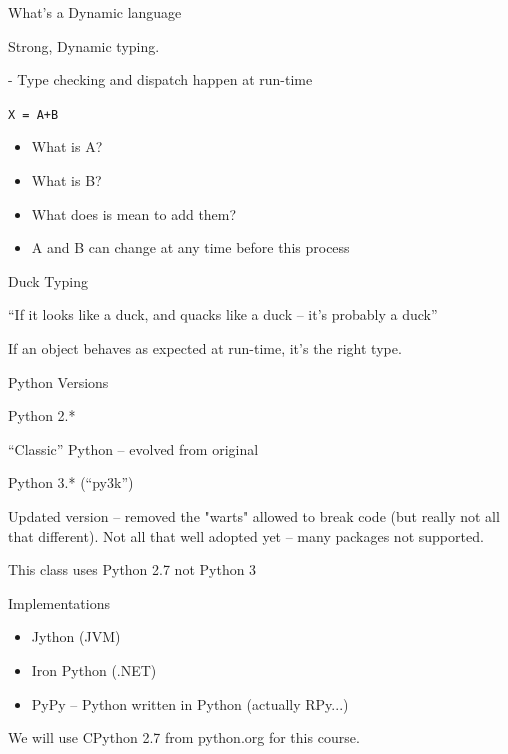 \documentclass{beamer}
\begin{document}
\begin{frame}[fragile]{What's a Dynamic language}

{Strong, Dynamic typing.}

 - Type checking and dispatch happen at run-time

\vspace{0.25in}
{\Large \verb!X = A+B!}
\vspace{0.1in}
\begin{itemize}
\pause
  \item What is A?
  \item What is B?
  \item What does is mean to add them?
\vspace{0.2in}
\pause
  \item A and B can change at any time before this process
\end{itemize}

\end{frame} 


\begin{frame}{Duck Typing}

\vspace{0.25in}
{\center \Large ``If it looks like a duck, and quacks like a duck -- it's probably a duck''}

\pause
\vspace{0.5in}
{\center \Large If an object behaves as expected at run-time, it's the right type.}

\end{frame}



\begin{frame}{Python Versions}

{\Large Python 2.*}

``Classic'' Python -- evolved from original

\vspace{0.25in}
{\Large Python 3.* (``py3k'')}

Updated version -- removed the "warts" allowed to break code (but really not all that different).
Not all that well adopted yet -- many packages not supported.

\vspace{0.25in}
This class uses Python 2.7 not Python 3

\end{frame}


\begin{frame}{Implementations}

\begin{itemize}
    \item Jython (JVM)
    \item Iron Python (.NET)
    \item PyPy -- Python written in Python (actually RPy...)
\end{itemize}

\vspace{0.25in}
  We will use CPython 2.7 from python.org for this course.

\end{frame}
\end{document}

